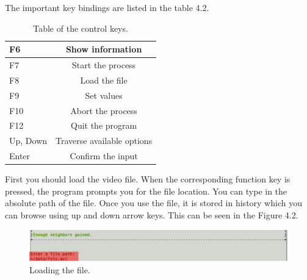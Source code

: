 The important key bindings are listed in the table 4.2.
\begin{table}[h]
\begin{center}
 \begin{tabular}{ | l | c |}
   \hline
   F6 & Show information \\ \hline
   F7 & Start the process \\ \hline
   F8 & Load the file \\ \hline
   F9 & Set values \\ \hline
   F10 & Abort the process \\ \hline
   F12 & Quit the program \\ \hline
   Up, Down & Traverse available options \\ \hline
   Enter & Confirm the input \\
 	\hline
 \end{tabular}
 \caption{Table of the control keys.}
 \end{center}
\end{table}

First you should load the video file. When the corresponding function key is pressed, the program prompts you for the file location. You can type in the absolute path of the file. Once you use the file, it is stored in history which you can browse using up and down arrow keys. This can be seen in the Figure 4.2.
\begin{figure}[h]
\begin{center}
\includegraphics[scale=0.30]{./img/loading.pdf}
\caption{Loading the file.}
\end{center}
\end{figure}

